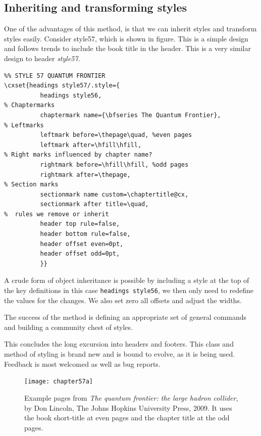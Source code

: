 \subsection{Inheriting and transforming styles}
One of the advantages of this method, is that we can inherit styles and transform styles easily. Consider style57, which is shown in figure. This is a simple design and follows trends to include the book title in the header. This is a very similar design to header \textit{style57}.

\begin{tcolorbox}
\begin{lstlisting}
%% STYLE 57 QUANTUM FRONTIER
\cxset{headings style57/.style={
          headings style56,
% Chaptermarks
          chaptermark name={\bfseries The Quantum Frontier},
% Leftmarks
          leftmark before=\thepage\quad, %even pages
          leftmark after=\hfill\hfill,
% Right marks influenced by chapter name?
          rightmark before=\hfill\hfill, %odd pages
          rightmark after=\thepage,
% Section marks
          sectionmark name custom=\chaptertitle@cx,
          sectionmark after title=\quad,
%  rules we remove or inherit
          header top rule=false,
          header bottom rule=false,
          header offset even=0pt,
          header offset odd=0pt,
          }}
\end{lstlisting}
\end{tcolorbox}

A crude form of object inheritance is possible by including a style at the top of the key definitions in this case \texttt{headings style56}, we then only need to redefine the values for the changes. We also set zero all offsets and adjust the widths.

The success of the method is defining an appropriate set of general commands and building a community chest of styles.

This concludes the long excursion into headers and footers. This class and method of styling is brand new and is bound to evolve, as it is being used. Feedback is most welcomed as well as bug reports.
\begin{figure}[tp]
\centering
\texttt{[image: chapter57a]}\vspace{0.5\baselineskip}
\caption{Example pages from \textit{The quantum frontier: the large hadron collider}, by Don Lincoln, The Johns Hopkins University Press, 2009.  It uses the book short-title at even pages and the chapter title at the odd pages.}
\end{figure}

